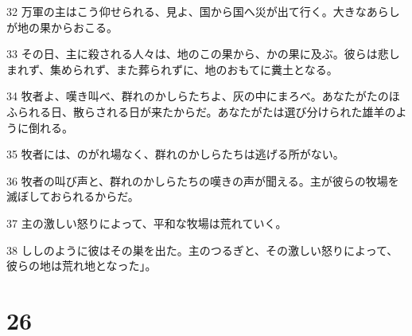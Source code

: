 \par 32 万軍の主はこう仰せられる、見よ、国から国へ災が出て行く。大きなあらしが地の果からおこる。
\par 33 その日、主に殺される人々は、地のこの果から、かの果に及ぶ。彼らは悲しまれず、集められず、また葬られずに、地のおもてに糞土となる。
\par 34 牧者よ、嘆き叫べ、群れのかしらたちよ、灰の中にまろべ。あなたがたのほふられる日、散らされる日が来たからだ。あなたがたは選び分けられた雄羊のように倒れる。
\par 35 牧者には、のがれ場なく、群れのかしらたちは逃げる所がない。
\par 36 牧者の叫び声と、群れのかしらたちの嘆きの声が聞える。主が彼らの牧場を滅ぼしておられるからだ。
\par 37 主の激しい怒りによって、平和な牧場は荒れていく。
\par 38 ししのように彼はその巣を出た。主のつるぎと、その激しい怒りによって、彼らの地は荒れ地となった」。

\chapter{26}

